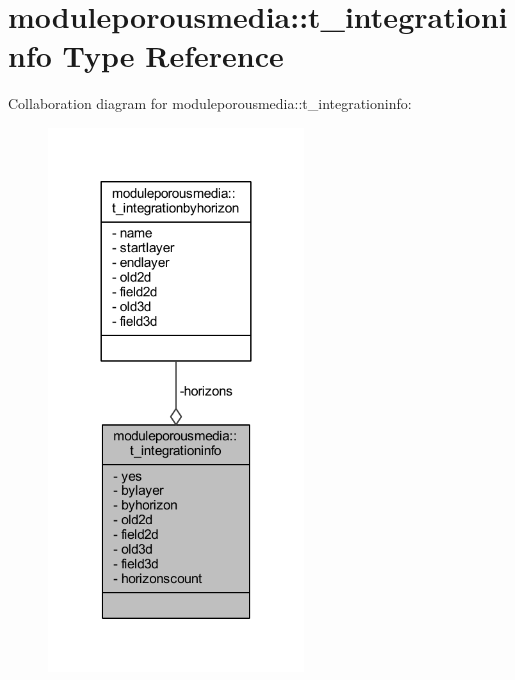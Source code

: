 \hypertarget{structmoduleporousmedia_1_1t__integrationinfo}{}\section{moduleporousmedia\+:\+:t\+\_\+integrationinfo Type Reference}
\label{structmoduleporousmedia_1_1t__integrationinfo}


Collaboration diagram for moduleporousmedia\+:\+:t\+\_\+integrationinfo\+:\nopagebreak
\begin{figure}[H]
\begin{center}
\leavevmode
\includegraphics[width=192pt]{structmoduleporousmedia_1_1t__integrationinfo__coll__graph}
\end{center}
\end{figure}
